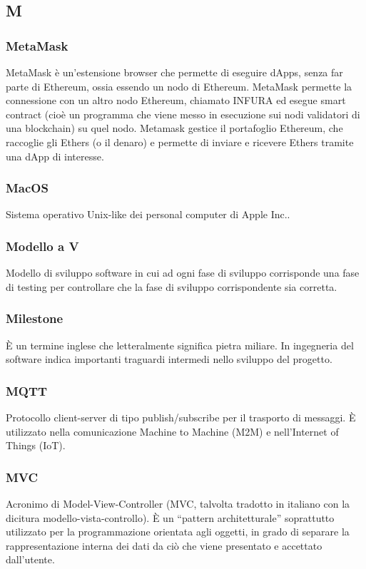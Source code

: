 \subsection*{M}
\subsubsection*{MetaMask} MetaMask è un'estensione browser che permette di eseguire dApps, senza far parte di Ethereum, ossia essendo un nodo di Ethereum. MetaMask permette la connessione con un altro nodo Ethereum, chiamato INFURA ed esegue smart contract (cioè un programma che viene messo in esecuzione sui nodi validatori di una blockchain) su quel nodo. Metamask gestice il portafoglio Ethereum, che raccoglie gli Ethers (o il denaro) e permette di inviare e ricevere Ethers tramite una dApp di interesse.
\subsubsection*{MacOS} Sistema operativo Unix-like dei personal computer di Apple Inc..
\subsubsection*{Modello a V} Modello di sviluppo software in cui ad ogni fase di sviluppo corrisponde una fase di testing per controllare che la fase di sviluppo corrispondente sia corretta.
\subsubsection*{Milestone} È un termine inglese che letteralmente significa pietra miliare. In ingegneria del software indica importanti traguardi intermedi nello sviluppo del progetto.
\subsubsection*{MQTT} Protocollo client-server di tipo publish/subscribe per il trasporto di messaggi. È utilizzato nella comunicazione Machine to Machine (M2M) e nell'Internet of Things (IoT).
\subsubsection*{MVC} Acronimo di Model-View-Controller (MVC, talvolta tradotto in italiano con la dicitura modello-vista-controllo). È un “pattern architetturale”  soprattutto utilizzato per la programmazione orientata agli oggetti, in grado di separare la rappresentazione interna dei dati da ciò che viene presentato e accettato dall'utente.
